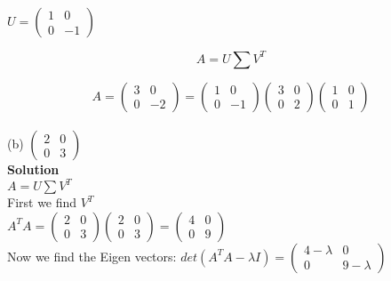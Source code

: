 \documentclass[12pt, oneside]{article}   	%
\begin{document}
\begin{enumerate}
	$
	U= \left( \begin{array}{cc} 1&0 \\ 0& -1  \end{array} \right)
	$
	
		$$A=U\sum V^T$$
		
		$$A=\left( \begin{array}{cc} 3 & 0 \\ 0 & -2  \end{array} \right)=\left( \begin{array}{cc} 1&0 \\ 0& -1  \end{array} \right) \left( \begin{array}{cc} 3 & 0 \\ 0 & 2  \end{array} \right) \left( \begin{array}{cc}1& 0 \\0& 1  \end{array} \right)$$\\

	\vspace{2cm}
	(b) $\left( \begin{array}{cc} 2 & 0 \\ 0 &  3  \end{array} \right)$  \quad \\
	
	\textbf{Solution}\\
	
	$A=U\sum V^T$\\
	
	First we find $V^T$ \\
	
	$A^TA =\left( \begin{array}{cc} 2 & 0 \\ 0 & 3  \end{array} \right)\left( \begin{array}{cc} 2 & 0 \\ 0 & 3  \end{array} \right) =\left( \begin{array}{cc} 4 & 0 \\ 0 & 9  \end{array} \right)$\\
	
	Now we find the Eigen vectors:
	$det(A^TA- \lambda I)= \left( \begin{array}{cc} 4-\lambda & 0 \\ 0 & 9-\lambda  \end{array} \right)$\\
	

\end{enumerate}
\end{document}
